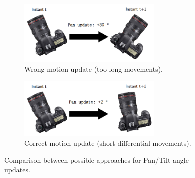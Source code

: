 	 \begin{figure}[h]
	 	\centering
	 	\begin{subfigure}[h]{0.4\linewidth}
	 		\centering
	 		\includegraphics[width=2.7in]{images/ptz_wrong_movement}
	 		\caption{Wrong motion update (too long movements).}
	 		\label{fig:3_ptz_wrong}
	 	\end{subfigure}
	 	\qquad
	 	\begin{subfigure}[h]{0.4\linewidth}
	 		\centering
	 		\includegraphics[width=2.7in]{images/ptz_correct_movement}
	 		\caption{Correct motion update (short differential movements).}
	 		\label{fig:3_ptz_right}
	 	\end{subfigure}
	 	\caption{Comparison between possible approaches for Pan/Tilt angle updates.}
	 	\label{fig:3_ptz_movements}
	 \end{figure}
	 
	
	
	
	
	
	
